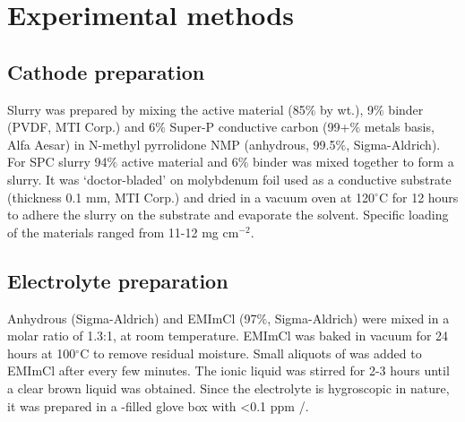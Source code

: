 \section{Experimental methods}
\subsection{Cathode preparation}
Slurry was prepared by mixing the active material (85$\%$ by wt.), 9$\%$ binder (PVDF, MTI Corp.) and 6$\%$ Super-P conductive carbon (99+$\%$ metals basis, Alfa Aesar) in N-methyl pyrrolidone NMP (anhydrous, 99.5$\%$, Sigma-Aldrich). For SPC slurry 94$\%$ active material and 6$\%$ binder was mixed together to form a slurry. It was ‘doctor-bladed’ on molybdenum foil used as a conductive substrate (thickness 0.1 mm, MTI Corp.) and dried in a vacuum oven at 120$^{\circ}$C for 12 hours to adhere the slurry on the substrate and evaporate the solvent. Specific loading of the materials ranged from 11-12 mg cm$^{-2}$. 
\subsection{Electrolyte preparation}
Anhydrous  (Sigma-Aldrich) and EMImCl (97$\%$, Sigma-Aldrich) were mixed in a molar ratio of 1.3:1, at room temperature. EMImCl was baked in vacuum for 24 hours at 100$^{\circ}$C to remove residual moisture. Small aliquots of  was added to EMImCl after every few minutes. The ionic liquid was stirred for 2-3 hours until a clear brown liquid was obtained. Since the electrolyte is hygroscopic in nature, it was prepared in a -filled glove box with <0.1 ppm /. 
